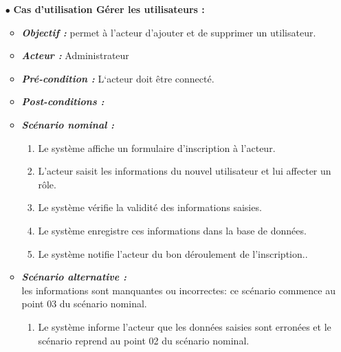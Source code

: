 \begin{itemize}
	\item[$\bullet$] \textbf{Cas d’utilisation Gérer les utilisateurs :} 
	\medskip
	\begin{itemize}
		\item \textit{\textbf{Objectif :}} permet à l’acteur d’ajouter et de supprimer un utilisateur. 
		
		\item \textit{\textbf{Acteur :}} Administrateur
		
		\item \textit{\textbf{Pré-condition  :}} L‘acteur doit être connecté.
		\item \textit{\textbf{Post-conditions   :}}
		\item \textit{\textbf{Scénario nominal :}}
		\begin{enumerate}
			\item Le système affiche un formulaire d’inscription à l’acteur. 
			\item L’acteur saisit les informations du nouvel utilisateur et lui affecter un rôle. 
			\item    Le système vérifie la validité des informations saisies. 
			\item  Le système enregistre ces informations dans la base de données.  
			\item Le système notifie l’acteur du bon déroulement de l’inscription..
		\end{enumerate}
		\item \textit{\textbf{Scénario alternative :}} \\
les informations sont manquantes ou incorrectes: ce scénario commence au point 03 du
scénario nominal.
		\begin{enumerate}
			\item  Le système informe l’acteur que les données saisies sont erronées et le scénario reprend au point 02 du scénario nominal.
		\end{enumerate}
	\end{itemize}
\end{itemize}	
\bigskip
